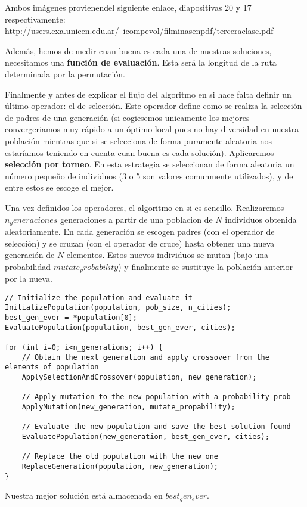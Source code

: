 Ambos imágenes provienendel siguiente enlace, diapositivas 20 y 17 respectivamente:
http://users.exa.unicen.edu.ar/~icompevol/filminasenpdf/terceraclase.pdf

Además, hemos de medir cuan buena es cada una de nuestras soluciones, necesitamos una \textbf{función de evaluación}. Esta será la longitud de la ruta determinada por la permutación.

Finalmente y antes de explicar el flujo del algoritmo en si hace falta definir un último operador: el de selección. Este operador define como se realiza la selección de padres de una generación (si cogiesemos unicamente los mejores convergeriamos muy rápido a un óptimo local pues no hay diversidad en nuestra población mientras que si se selecciona de forma puramente aleatoria nos estaríamos teniendo en cuenta cuan buena es cada solución). Aplicaremos \textbf{selección por torneo}. En esta estrategia se seleccionan de forma aleatoria un número pequeño de individuos (3 o 5 son valores comunmente utilizados), y de entre estos se escoge el mejor.

Una vez definidos los operadores, el algoritmo en si es sencillo. Realizaremos $n_generaciones$ generaciones a partir de una poblacion de $N$ individuos obtenida aleatoriamente. En cada generación se escogen padres (con el operador de selección) y se cruzan (con el operador de cruce) hasta obtener una nueva generación de $N$ elementos. Estos nuevos individuos se mutan (bajo una probabilidad $mutate_probability$) y finalmente se sustituye la población anterior por la nueva.

\begin{verbatim}
// Initialize the population and evaluate it
InitializePopulation(population, pob_size, n_cities);
best_gen_ever = *population[0];
EvaluatePopulation(population, best_gen_ever, cities);

for (int i=0; i<n_generations; i++) {
	// Obtain the next generation and apply crossover from the elements of population
	ApplySelectionAndCrossover(population, new_generation);
	
	// Apply mutation to the new population with a probability prob
	ApplyMutation(new_generation, mutate_propability);
	
	// Evaluate the new population and save the best solution found
	EvaluatePopulation(new_generation, best_gen_ever, cities);
	
	// Replace the old population with the new one
	ReplaceGeneration(population, new_generation);
}
\end{verbatim}

Nuestra mejor solución está almacenada en $best_gen_ever$.
